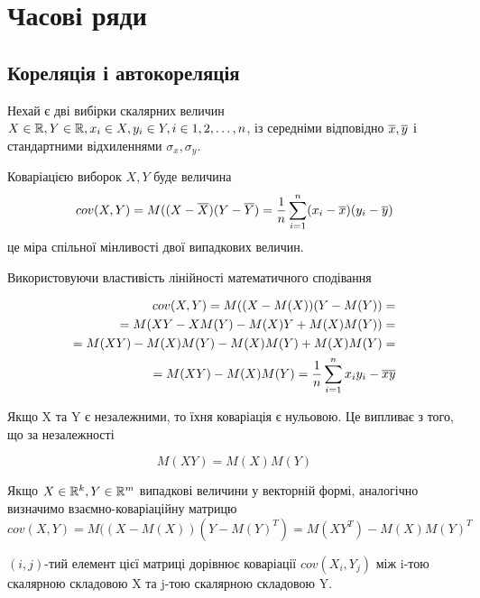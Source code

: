 \section{Часові ряди}

\subsection{Кореляція і автокореляція}

Нехай є дві вибірки скалярних величин $X \in \Bbb R , Y\in \Bbb R, x_i \in X, y_i \in Y, i \in 1, 2, \ldots, n$, із середніми відповідно $\overline{x}, \overline{y}$ і стандартними відхиленнями $\sigma_x, \sigma_y$.

\begin{ozn}
Коваріацією виборок $X, Y$ буде величина 
\begin{equation}
 cov(X,Y) = M((X - \overline{X})(Y - \overline{Y}) = \frac{1}{n} \sum_{i = 1}^{n} (x_i - \overline{x})(y_i - \overline{y})
\end{equation}
це міра спільної мінливості двої випадкових величин.

Використовуючи властивість лінійності математичного сподівання

\begin{equation}
\begin{split}
 cov(X,Y) = M((X - M(X))(Y - M(Y)) = \\
 = M(XY - XM(Y) - M(X)Y + M(X)M(Y)) = \\
 = M(XY) - M(X)M(Y) - M(X)M(Y) + M(X)M(Y) = \\
 = M(XY) - M(X)M(Y) = \frac{1}{n} \sum_{i = 1}^{n} x_i y_i - \overline{x} \overline{y}
\end{split}
\end{equation}

Якщо X та Y є незалежними, то їхня коваріація є нульовою. Це випливає з того, що за незалежності

\begin{equation}
M(XY) = M(X)M(Y)
\end{equation}



Якщо $X\in \Bbb R^k, Y\in \Bbb R^m$ випадкові величини у векторній формі, аналогічно визначимо взаємно-коваріаційну матрицю
\begin{equation}
cov(X,Y) = M((X - M(X))(Y - M(Y)^T) = M(XY^T) - M(X)M(Y)^T
\end{equation}

$(i, j)$-тий елемент цієї матриці дорівнює коваріації $cov(X_i, Y_j)$ між i-тою скалярною складовою X та j-тою скалярною складовою Y.
\end{ozn}


